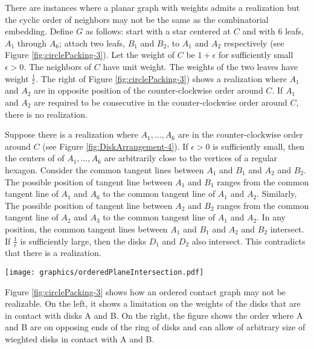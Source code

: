 \documentclass[10pt]{CSUNthesis}
\theoremstyle{plain}%
\theoremstyle{definition}
\theoremstyle{remark}
\begin{document}
There are instances where a planar graph with weights admits a realization but the cyclic order of neighbors may not be the same as the combinatorial embedding.
Define $G$ as follows: start with a star centered at $C$ and with 6 leafs, $A_1$ through $A_6$; attach two leafs, $B_1$ and $B_2$, to $A_1$ and  $A_2$ respectively (see  Figure \ref{fig:circlePacking-3}).
Let the weight of $C$ be $1+\epsilon$ for sufficiently small $\epsilon > 0$.
The neighbors of $C$ have unit weight.
The weights of the two leaves have weight $\frac{1}{\epsilon}$.  
The right of Figure \ref{fig:circlePacking-3}) shows a realization where $A_1$ and $A_2$ are in opposite position of the counter-clockwise order around $C$.
If $A_1$ and $A_2$ are required to be consecutive in the counter-clockwise order around $C$, there is no realization.

Suppose there is a realization where $A_1, \ldots, A_6$ are in the counter-clockwise order around $C$ (see Figure \ref{fig:DiskArrangement-4}).
If $\epsilon>0$ is sufficiently small, then the centers of of $A_1, \ldots, A_6$ are arbitrarily close to the vertices of a regular hexagon.
Consider the common tangent lines between $A_1$ and $B_1$ and $A_2$ and $B_2$.
The possible position of tangent line between $A_1$ and $B_1$ ranges from the common tangent line of $A_1$ and $A_6$ to the common tangent line of $A_1$ and $A_2$.
Similarly, The possible position of tangent line between $A_2$ and $B_2$ ranges from the common tangent line of $A_2$ and $A_3$ to the common tangent line of $A_1$ and $A_2$.
In any position, the common tangent lines between $A_1$ and $B_1$ and $A_2$ and $B_2$ intersect.
If $\frac{1}{\epsilon}$ is sufficiently large, then the disks $D_1$ and $D_2$ also intersect.
This contradicts that there is a realization.

\begin{minipage}{\linewidth}
\begin{center}
\texttt{[image: graphics/orderedPlaneIntersection.pdf]}
\end{center}
\label{fig:DiskArrangement-4}
\end{minipage}

Figure \ref{fig:circlePacking-3} shows how an ordered contact graph may not be realizable.  
On the left, it shows a limitation on the weights of the disks that are in contact with disks A and B. 
On the right, the figure shows the order where A and B are on opposing ends of the ring of disks and can allow of arbitrary size of wieghted disks in contact with A and B.
\end{document}
